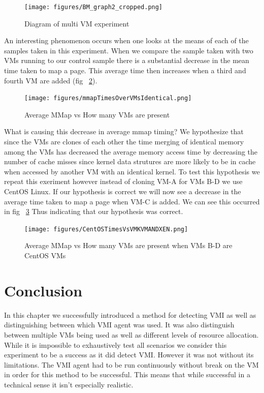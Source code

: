 	\begin{figure}[p!]\label{Fig4VMTest}
	  \centering
	  \texttt{[image: figures/BM\_graph2\_cropped.png]}
	  \caption{Diagram of multi VM experiment} 
	\end{figure}


An interesting phenomenon occurs when one looks at the means of each of the samples taken in this experiment. When we compare the sample taken with two VMs running to our control sample there is a substantial decrease in the mean time taken to map a page. This average time then increases when a third and fourth VM are added (fig ~\ref{Fig4VMTest}).

	\begin{figure}[p!]\label{Fig4VMTest}
		\centering
		\texttt{[image: figures/mmapTimesOverVMsIdentical.png]}
		\caption{Average MMap vs How many VMs are present}
	\end{figure}

What is causing this decrease in average mmap timing? We hypothesize that since the VMs are clones of each other the time merging of identical memory among the VMs has decreased the average memory access time by decreasing the number of cache misses since kernel data strutures are more likely to be in cache when accessed by another VM with an identical kernel. To test this hypothesis we repeat this exeriment however instead of cloning VM-A for VMs B-D we use CentOS Linux. If our hypothesis is correct we will now see a decrease in the average time taken to map a page when VM-C is added. We can see this occurred in fig ~\ref{Fig4VMTestCentOS} Thus indicating that our hypothesis was correct.

\begin{figure}[p!]\label{Fig4VMTestCentOS}
		\centering
		\texttt{[image: figures/CentOSTimesVsVMKVMANDXEN.png]}
		\caption{Average MMap vs How many VMs are present when VMs B-D are CentOS VMs}
	\end{figure}

 

\section{Conclusion}
In this chapter we successfully introduced a method for detecting VMI as well as distinguishing between which VMI agent was used. It was also distinguish between multiple VMs being used as well as different levels of resource allocation. While it is impossible to exhaustively test all scenarios we consider this experiment to be a success as it did detect VMI. However it was not without its limitations. The VMI agent had to be run continuously without break on the VM in order for this method to be successful. This means that while successful in a technical sense it isn't especially realistic. 